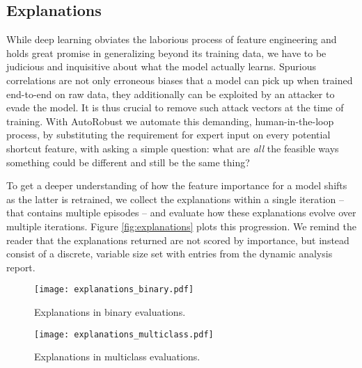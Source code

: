 \subsection{Explanations}
While deep learning obviates the laborious process of feature engineering and holds great promise in generalizing beyond its training data, we have to be judicious and inquisitive about what the model actually learns.
Spurious correlations are not only erroneous biases that a model can pick up when trained end-to-end on raw data, they additionally can be exploited by an attacker to evade the model.
It is thus crucial to remove such attack vectors at the time of training.
With AutoRobust we automate this demanding, human-in-the-loop process, by substituting the requirement for expert input on every potential shortcut feature, with asking a simple question: what are \textit{all} the feasible ways something could be different and still be the same thing?

To get a deeper understanding of how the feature importance for a model shifts as the latter is retrained, we collect the explanations within a single iteration -- that contains multiple episodes -- and evaluate how these explanations evolve over multiple iterations.
Figure \ref{fig:explanations} plots this progression.
We remind the reader that the explanations returned are not scored by importance, but instead consist of a discrete, variable size set with entries from the dynamic analysis report.

\begin{figure*}
\centering
\begin{subfigure}{1\columnwidth}
  \centering
  \texttt{[image: explanations\_binary.pdf]}
  \caption{Explanations in binary evaluations.}

\end{subfigure}
\begin{subfigure}{1\columnwidth}
  \centering
  \texttt{[image: explanations\_multiclass.pdf]}
  \caption{Explanations in multiclass evaluations.}

\end{subfigure}
\caption{The most frequent explanations as returned by the HMIL model explainer, over the 15 iterations. As for each iteration the number of episodes varies, we normalize explanations to a percentage over the whole iteration; mean values with one standard deviation are plotted.}
\label{fig:explanations}
\end{figure*}

